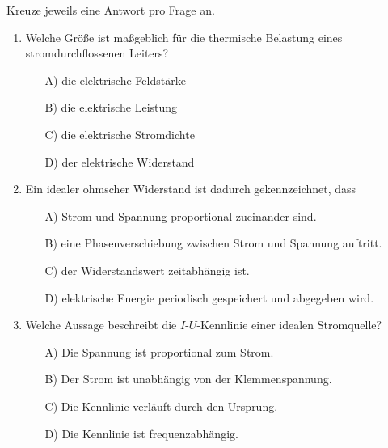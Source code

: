 \documentclass[a4paper,12pt]{article}
\newif\ifshowsolutions
\begin{document}
Kreuze jeweils eine Antwort pro Frage an.

\vspace{8pt}

\begin{enumerate}[label=\textbf{\arabic*.}, leftmargin=*, itemsep=8pt]

  \item Welche Größe ist maßgeblich für die thermische Belastung eines stromdurchflossenen Leiters?
    \begin{itemize}[label=$\square$]
      \item[A)] die elektrische Feldstärke
      \item[B)] die elektrische Leistung
      \item[C)] die elektrische Stromdichte
      \item[D)] der elektrische Widerstand
    \end{itemize}

\ifshowsolutions
Lösung: C
\fi

  \item Ein idealer ohmscher Widerstand ist dadurch gekennzeichnet, dass
    \begin{itemize}[label=$\square$]
      \item[A)] Strom und Spannung proportional zueinander sind.
      \item[B)] eine Phasenverschiebung zwischen Strom und Spannung auftritt.
      \item[C)] der Widerstandswert zeitabhängig ist.
      \item[D)] elektrische Energie periodisch gespeichert und abgegeben wird.
    \end{itemize}

\ifshowsolutions
Lösung: A
\fi

  \item Welche Aussage beschreibt die $I$-$U$-Kennlinie einer idealen Stromquelle?
    \begin{itemize}[label=$\square$]
      \item[A)] Die Spannung ist proportional zum Strom.
      \item[B)] Der Strom ist unabhängig von der Klemmenspannung.
      \item[C)] Die Kennlinie verläuft durch den Ursprung.
      \item[D)] Die Kennlinie ist frequenzabhängig.
    \end{itemize}

\ifshowsolutions
Lösung: B
\fi


\end{enumerate}
\end{document}
